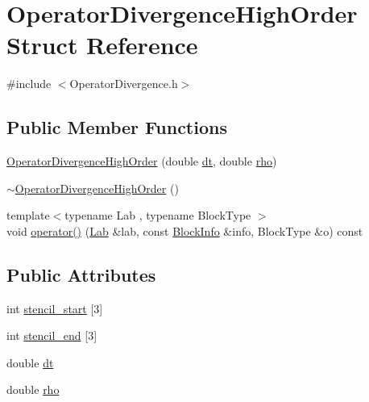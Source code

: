 \hypertarget{struct_operator_divergence_high_order}{}\section{Operator\+Divergence\+High\+Order Struct Reference}
\label{struct_operator_divergence_high_order}


{\ttfamily \#include $<$Operator\+Divergence.\+h$>$}

\subsection*{Public Member Functions}
\begin{DoxyCompactItemize}
\item 
\hyperlink{struct_operator_divergence_high_order_aba5019b17ebf12926fca631c503dd21d}{Operator\+Divergence\+High\+Order} (double \hyperlink{struct_operator_divergence_high_order_a16c473d6d3b191f2520278f99a022930}{dt}, double \hyperlink{struct_operator_divergence_high_order_a1687982fec9b2961cad004d986326d10}{rho})
\item 
\hyperlink{struct_operator_divergence_high_order_a022a0d3cc7413724ca51f54f411c701e}{$\sim$\+Operator\+Divergence\+High\+Order} ()
\item 
{\footnotesize template$<$typename Lab , typename Block\+Type $>$ }\\void \hyperlink{struct_operator_divergence_high_order_a9e4c5786679fb26492c19a8ef2fe1051}{operator()} (\hyperlink{_definitions_8h_ad6f951af9a2a6ebc1975404882b34314}{Lab} \&lab, const \hyperlink{struct_block_info}{Block\+Info} \&info, Block\+Type \&o) const 
\end{DoxyCompactItemize}
\subsection*{Public Attributes}
\begin{DoxyCompactItemize}
\item 
int \hyperlink{struct_operator_divergence_high_order_acb20b4fc7f077941f6328716a1607e13}{stencil\+\_\+start} \mbox{[}3\mbox{]}
\item 
int \hyperlink{struct_operator_divergence_high_order_a6021365d2be563a3febbf4e4bad3cd28}{stencil\+\_\+end} \mbox{[}3\mbox{]}
\item 
double \hyperlink{struct_operator_divergence_high_order_a16c473d6d3b191f2520278f99a022930}{dt}
\item 
double \hyperlink{struct_operator_divergence_high_order_a1687982fec9b2961cad004d986326d10}{rho}
\end{DoxyCompactItemize}


